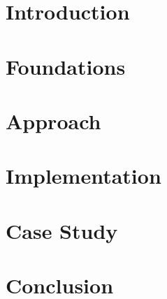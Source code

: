 \documentclass[
    pagesize,%
    a4paper,%
    headsepline,%
    footsepline,%
    headinclude,%
    footinclude,%
    bibtotoc,%
    cleardoubleplain,%
    tablecaptionabove,%
]{scrreprt}
\begin{document}


\areaset[1cm]{17cm}{27cm}%
\makecover



\pagestyle{headings}

\tableofcontents
\listoffigures
\listoftables

\setcounter{page}{3}


\clearpage
\chapter{Introduction}
\label{chap:introduction}


\clearpage
\chapter{Foundations}
\label{chap:foundations}


\chapter{Approach}
\label{chap:approach}


\clearpage
\chapter{Implementation}
\label{chap:implementation}


\clearpage
\chapter{Case Study}
\label{chap:casestudy}



\chapter{Conclusion}
\label{chap:conclusion}

\end{document}
